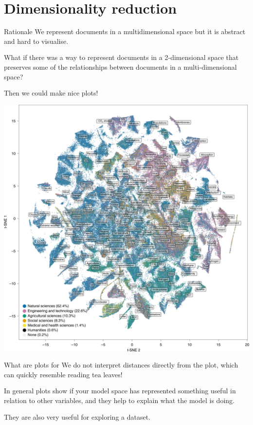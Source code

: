 \documentclass[
  10pt,
  ignorenonframetext,
  aspectratio=169]{beamer}
\begin{document}
\hypertarget{dimensionality-reduction}{%
\section{Dimensionality reduction}\label{dimensionality-reduction}}

\begin{frame}{Rationale}
\protect\hypertarget{rationale}{}
We represent documents in a multidimensional space but it is abstract
and hard to visualise.

What if there was a way to represent documents in a 2-dimensional space
that preserves some of the relationships between documents in a
multi-dimensional space?

Then we could make nice plots!
\end{frame}

\begin{frame}{}
\protect\hypertarget{section}{}
\centering

\includegraphics{images/cc_topography.png}
\end{frame}

\begin{frame}{What are plots for}
\protect\hypertarget{what-are-plots-for}{}
We do not interpret distances directly from the plot, which can quickly
resemble reading tea leaves!

In general plots show if your model space has represented something
useful in relation to other variables, and they help to explain what the
model is doing.

They are also very useful for exploring a dataset.
\end{frame}
\end{document}
